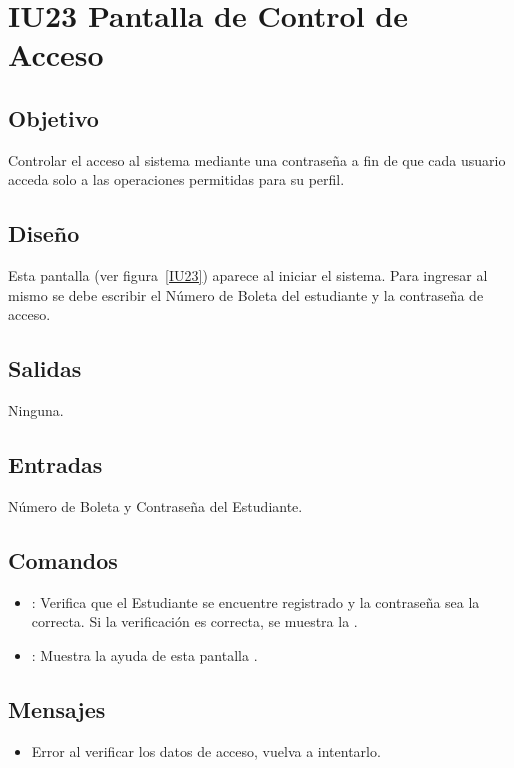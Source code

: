 \section{IU23 Pantalla de Control de Acceso}

\subsection{Objetivo}
	Controlar el acceso al sistema mediante una contraseña a fin de que cada usuario acceda solo a las operaciones permitidas para su perfil.

\subsection{Diseño}
	Esta pantalla  (ver figura~\ref{IU23}) aparece al iniciar el sistema. Para ingresar al mismo se debe escribir el Número de Boleta del estudiante y la contraseña de acceso. 


\subsection{Salidas}

	Ninguna.

\subsection{Entradas}
Número de Boleta y Contraseña del Estudiante.

\subsection{Comandos}
\begin{itemize}
	\item {}: Verifica que el Estudiante se encuentre registrado y la contraseña sea la correcta. Si la verificación es correcta, se muestra la .
	\item {}: Muestra la ayuda de esta pantalla .
\end{itemize}

\subsection{Mensajes}

\begin{itemize}
	\item Error al verificar los datos de acceso, vuelva a intentarlo.
\end{itemize}

